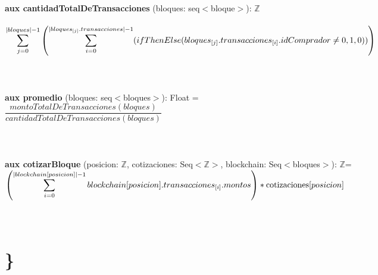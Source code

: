 \documentclass{article}
\newcommand{\Entero}{$\mathds{Z}$}
\begin{document}
    \textbf{aux cantidadTotalDeTransacciones} (bloques: seq$<$bloque$>$): \Entero\\\\
    \indent\indent$\mathlarger\sum\limits_{j=0}^{|bloques|-1} \left(\mathlarger\sum\limits_{i=0}^{|bloques_{[j]}.transacciones|-1} (ifThenElse(bloques_{[j]}.transacciones_{[i]}.idComprador \ne 0, 1, 0))\right)\indent\indent\indent$\\\\\\\\

    \textbf{aux promedio} (bloques: seq$<$bloques$>$): Float = \\

    \indent\indent$\dfrac{montoTotalDeTransacciones(bloques)}{cantidadTotalDeTransacciones(bloques)}$\\\\\\\\

    \textbf{aux cotizarBloque} (posicion: \Entero, cotizaciones: Seq$<$\Entero$>$, blockchain: Seq$<$bloques$>$): \Entero =\\

        \indent\indent $\left( \mathlarger{\sum\limits_{i=0}^{|blockchain[posicion]|-1} blockchain[posicion].transacciones_{[i]}.montos} \right) * \text{cotizaciones}[posicion]$\\\\\\

\section*{\}}
\end{document}
